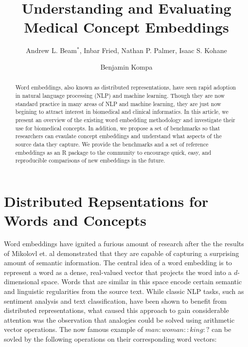 \documentclass{ws-procs11x85}
\begin{document}
\title{Understanding and Evaluating Medical Concept Embeddings}

\author{Andrew L. Beam$^*$, Inbar Fried, Nathan P. Palmer, Isaac S. Kohane}

\address{Department of Biomedical Informatics, Harvard Medical School,\\
Boston, MA, 02115, USA\\
$^*$E-mail: Andrew\_Beam@hms.harvard.edu\\
www.university\_name.edu}

\author{Benjamin Kompa}

\address{University of North Carolina, Chapel Hill,\\
Chapel Hill, NC, 27514, USA\\
E-mail: kompa@live.unc.edu}

\begin{abstract}
Word embeddings, also known as distributed representations, have seen rapid adoption in natural language processing (NLP) and machine learning. Though they are now standard practice in many areas of NLP and machine learning, they are just now begining to attract interest in biomedical and clinical informatics. In this article, we present an overview of the existing word embedding methodology and investigate their use for biomedical concepts. In addition, we propose a set of benchmarks so that researchers can evaulate concept embeddings and understand what aspects of the source data they capture. We provide the benchmarks and a set of reference embeddings as an R package to the community to encourage quick, easy, and reproducible comparisons of new embeddings in the future.
\end{abstract}


\bodymatter


\section{Distributed Repsentations for Words and Concepts}\label{aba:intro}
Word embeddings have ignited a furious amount of research after the the results of Mikolovl\cite{mikolov2013distributed} et. al demonstrated that they are capable of capturing a surprising amount of semantic information. The central idea of a word embedding is to represent a word as a dense, real-valued vector that projects the word into a $d$-dimensional space. Words that are similar in this space encode certain semantic and linguistic regularities from the source text. While classic NLP tasks, such as sentiment analysis and text classification, have been shown to benefit from distributed representations, what caused this approach to gain considerable attention was the observation that analogies could be solved using arithmetic vector operations. The now famous example of $man:woman::king:?$ can be sovled by the following operations on their corresponding word vectors: 
\end{document}
